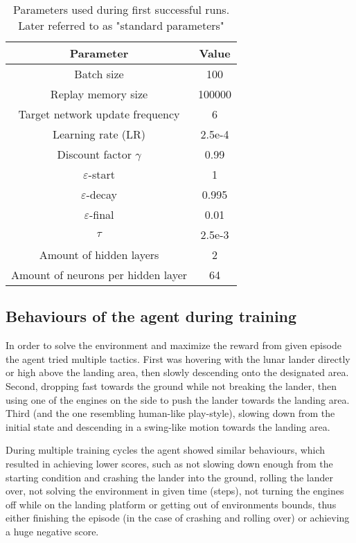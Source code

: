 \documentclass{article}
\begin{document}
\begin{table}[h]
\caption{Parameters used during first successful runs. Later referred to as "standard parameters"}
\label{tab:table1}
\centering
    \begin{tabular}{cc}
        \hline
        \textbf{Parameter} & \textbf{Value} \\
        \hline
        Batch size                          & 100     \\
        Replay memory size                  & 100000  \\
        Target network update frequency     & 6       \\
        Learning rate (LR)                  & 2.5e-4  \\
        Discount factor $\gamma$            & 0.99    \\
        $\varepsilon$-start                 & 1       \\
        $\varepsilon$-decay                 & 0.995   \\
        $\varepsilon$-final                 & 0.01    \\
        $\tau$                              & 2.5e-3  \\
        Amount of hidden layers             & 2       \\
        Amount of neurons per hidden layer  & 64      \\
        \hline
\end{tabular}
\end{table}

\subsection*{Behaviours of the agent during training}
In order to solve the environment and maximize the reward from given episode the agent tried multiple tactics. First was hovering with the lunar lander directly or high above the landing area, then slowly descending onto the designated area. Second, dropping fast towards the ground while not breaking the lander, then using one of the engines on the side to push the lander towards the landing area. Third (and the one resembling human-like play-style), slowing down from the initial state and descending in a swing-like motion towards the landing area.

During multiple training cycles the agent showed similar behaviours, which resulted in achieving lower scores, such as not slowing down enough from the starting condition and crashing the lander into the ground, rolling the lander over, not solving the environment in given time (steps), not turning the engines off while on the landing platform or getting out of environments bounds, thus either finishing the episode (in the case of crashing and rolling over) or achieving a huge negative score.
\end{document}
